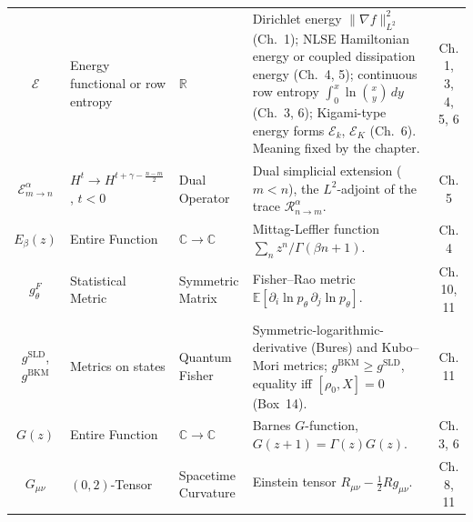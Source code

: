 \documentclass[11pt,a4paper,oneside]{article}
\begin{document}
\begin{table}[!htbp]
\begin{tabularx}{\textwidth}{@{} c p{3.0cm} p{2.6cm} X c @{}}
$\mathcal{E}$ & Energy functional or row entropy & $\mathbb{R}$ & Dirichlet energy $\|\nabla f\|_{L^2}^2$ (Ch.~1); NLSE Hamiltonian energy or coupled dissipation energy (Ch.~4, 5); continuous row entropy $\int_0^x\ln\binom{x}{y}\,dy$ (Ch.~3, 6); Kigami-type energy forms $\mathcal{E}_k$, $\mathcal{E}_K$ (Ch.~6). Meaning fixed by the chapter. & Ch. 1, 3, 4, 5, 6 \\
$\mathcal{E}_{m \to n}^\alpha$ & $H^t \to H^{t+\gamma-\frac{n-m}{2}}$, $t < 0$ & Dual Operator & Dual simplicial extension ($m < n$), the $L^2$-adjoint of the trace $\mathcal{R}_{n \to m}^\alpha$. & Ch. 5 \\
$E_\beta(z)$ & Entire Function & $\mathbb{C} \to \mathbb{C}$ & Mittag-Leffler function $\sum_n z^n/\Gamma(\beta n+1)$. & Ch. 4 \\
$g^F_\theta$ & Statistical Metric & Symmetric Matrix & Fisher--Rao metric $\mathbb{E}[\partial_i \ln p_\theta \, \partial_j \ln p_\theta]$. & Ch. 10, 11 \\
$g^{\mathrm{SLD}}$, $g^{\mathrm{BKM}}$ & Metrics on states & Quantum Fisher & Symmetric-logarithmic-derivative (Bures) and Kubo--Mori metrics; $g^{\mathrm{BKM}} \ge g^{\mathrm{SLD}}$, equality iff $[\rho_0, X] = 0$ (Box~14). & Ch. 11 \\
$G(z)$ & Entire Function & $\mathbb{C} \to \mathbb{C}$ & Barnes $G$-function, $G(z+1) = \Gamma(z)G(z)$. & Ch. 3, 6 \\
$G_{\mu\nu}$ & $(0,2)$-Tensor & Spacetime Curvature & Einstein tensor $R_{\mu\nu} - \frac{1}{2}Rg_{\mu\nu}$. & Ch. 8, 11 \\
\bottomrule
\end{tabularx}
\end{table}
\end{document}
